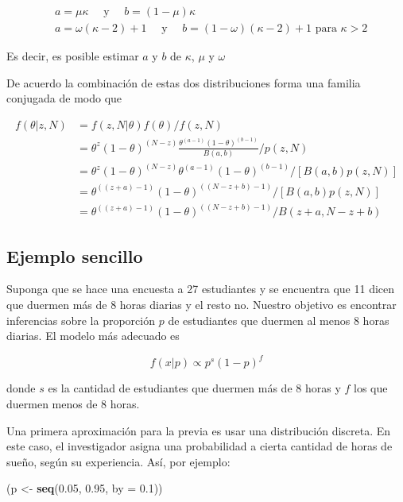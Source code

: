 \documentclass[
  12pt,
]{book}
\newenvironment{Shaded}{\begin{snugshade}}{\end{snugshade}}
\newcommand{\DataTypeTok}[1]{\textcolor[rgb]{0.13,0.29,0.53}{#1}}
\newcommand{\FloatTok}[1]{\textcolor[rgb]{0.00,0.00,0.81}{#1}}
\newcommand{\KeywordTok}[1]{\textcolor[rgb]{0.13,0.29,0.53}{\textbf{#1}}}
\newcommand{\NormalTok}[1]{#1}
\newcommand{\StringTok}[1]{\textcolor[rgb]{0.31,0.60,0.02}{#1}}
\theoremstyle{definition}
\theoremstyle{definition}
\theoremstyle{definition}
\theoremstyle{remark}
\begin{document}
\begin{align*}
          & a=\mu \kappa \quad \text { y } \quad b=(1-\mu) \kappa                                         \\
          & a=\omega(\kappa-2)+1 \quad \text { y } \quad b=(1-\omega)(\kappa-2)+1 \text { para } \kappa>2
\end{align*}

Es decir, es posible estimar \(a\) y \(b\) de \(\kappa\), \(\mu\) y \(\omega\)

De acuerdo la combinación de estas dos distribuciones forma una familia conjugada de modo que

\begin{align*}
        f(\theta | z, N)
          & = f(z, N | \theta) f(\theta) / f(z, N)
        \quad                                              \\
          & = \theta^{z}(1-\theta)^{(N-z)} \frac{\theta^{(a-1)}(1-\theta)^{(b-1)}}{B(a, b)} / p(z, N) \\
          & = \theta^{z}(1-\theta)^{(N-z)} \theta^{(a-1)}(1-\theta)^{(b-1)} /[B(a, b) p(z, N)]        \\
          & = \theta^{((z+a)-1)}(1-\theta)^{((N-z+b)-1)} /[B(a, b) p(z, N)]                           \\
          & = \theta^{((z+a)-1)}(1-\theta)^{((N-z+b)-1)} / B(z+a, N-z+b)
\end{align*}

\hypertarget{ejemplo-sencillo}{%
\subsection{Ejemplo sencillo}\label{ejemplo-sencillo}}

Suponga que se hace una encuesta a 27 estudiantes y se encuentra que
11 dicen que duermen más de 8 horas diarias y el resto no. Nuestro
objetivo es encontrar inferencias sobre la proporción \(p\) de
estudiantes que duermen al menos 8 horas diarias. El modelo más
adecuado es

\[
        f(x \vert p) \propto p^s (1-p)^f
\]

donde \(s\) es la cantidad de estudiantes que duermen más de 8 horas y
\(f\) los que duermen menos de 8 horas.

Una primera aproximación para la previa es usar una distribución
discreta. En este caso, el investigador asigna una probabilidad a
cierta cantidad de horas de sueño, según su experiencia. Así, por
ejemplo:

\begin{Shaded}
\begin{Highlighting}[]
\NormalTok{(p <-}\StringTok{ }\KeywordTok{seq}\NormalTok{(}\FloatTok{0.05}\NormalTok{, }\FloatTok{0.95}\NormalTok{, }\DataTypeTok{by =} \FloatTok{0.1}\NormalTok{))}
\end{Highlighting}
\end{Shaded}
\end{document}
